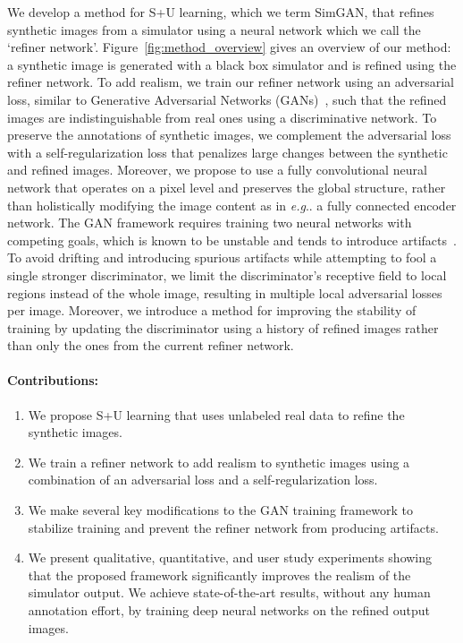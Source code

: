 \documentclass[10pt,twocolumn,letterpaper]{article}
\makeatletter
\DeclareRobustCommand\onedot{\futurelet\@let@token\@onedot}
\def\@onedot{\ifx\@let@token.\else.\null\fi\xspace}
\def\eg{\emph{e.g}\onedot} \def\Eg{\emph{E.g}\onedot}
\makeatother
\begin{document}
We develop a method for S+U learning, which we term SimGAN, that refines synthetic images from a simulator using a neural network which we call the `refiner network'.
Figure~\ref{fig:method_overview} gives an overview of our method: a synthetic image is generated with a black box simulator and is refined using the refiner network. 
To add realism, we train our refiner network using an adversarial loss, similar to Generative Adversarial Networks (GANs)~\cite{Goodfellow14}, such that the refined images are indistinguishable from real ones using a discriminative network.
To preserve the annotations of synthetic images, we complement the adversarial loss with a self-regularization loss that penalizes large changes between the synthetic and refined images.
Moreover, we propose to use a fully convolutional neural network that operates on a pixel level and preserves the global structure, rather than holistically modifying the image content as in \eg a fully connected encoder network.
The GAN framework requires training two neural networks with competing goals, which is known to be unstable and tends to introduce artifacts~\cite{Salimans16}.
To avoid drifting and introducing spurious artifacts while attempting to fool a single stronger discriminator, we limit the discriminator's receptive field to local regions instead of the whole image, resulting in multiple local adversarial losses per image. 
Moreover, we introduce a method for improving the stability of training by updating the discriminator using a history of refined images rather than only the ones from the current refiner network. 
\paragraph{Contributions:}
\begin{enumerate}
\item We propose S+U learning that uses unlabeled real data to refine the synthetic images. 
\item We train a refiner network to add realism to synthetic images using a combination of an adversarial loss and a self-regularization loss.
\item We make several key modifications to the GAN training framework to stabilize training and prevent the refiner network from producing artifacts.
\item We present qualitative, quantitative, and user study experiments showing that the proposed framework significantly improves the realism of the simulator output.
We achieve state-of-the-art results, without any human annotation effort, by training deep neural networks on the refined output images.
\end{enumerate}
\end{document}
